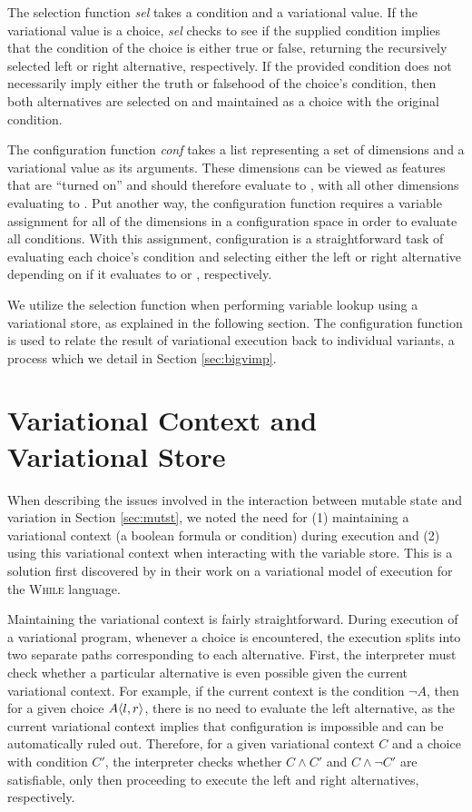 \documentclass[12pt,oneside]{book}
\begin{document}
The selection function \emph{sel} takes a condition and a variational value. If the variational value is a choice, \emph{sel} checks to see
if the supplied condition implies that the condition of the choice is either true or false, returning the recursively selected left or right alternative, respectively.
If the provided condition does not necessarily imply either the truth or falsehood of the choice's condition, then both alternatives are selected on
and maintained as a choice with the original condition.

The configuration function \emph{conf} takes a list representing a set of dimensions and a variational value as its arguments. These dimensions can be viewed as
features that are ``turned on'' and should therefore evaluate to , with all other dimensions evaluating to . Put another way, the configuration
function requires a variable assignment for all of the dimensions in a configuration space in order to evaluate all conditions. With this assignment, configuration
is a straightforward task of evaluating each choice's condition and selecting either the left or right alternative depending on if it evaluates to  or , respectively.

We utilize the selection function when performing variable lookup using a variational store, as explained in the following section. The configuration function is used to
relate the result of variational execution back to individual variants, a process which we detail in Section \ref{sec:bigvimp}.

\section{Variational Context and Variational Store}
\label{sec:vcvs}

When describing the issues involved in the interaction between mutable state and variation in Section \ref{sec:mutst}, we noted the need for (1) maintaining a variational context
(a boolean formula or condition)
during execution and (2) using this variational context when interacting with the variable store. This is a solution first discovered by \cite{varwhile} in their work on a
variational model of execution for the \textsc{While} language.

Maintaining the variational context is fairly straightforward. During execution of a variational program, whenever a choice is encountered, the execution splits into
two separate paths corresponding to each alternative. First, the interpreter must check whether a particular alternative is even possible given the current variational
context. For example, if the current context is the condition $\neg A$, then for a given choice $A \langle l, r \rangle$, there is no need to evaluate the left alternative, as the current
variational context implies that
configuration is impossible and can be automatically ruled out. Therefore, for a given variational context $C$ and a choice with condition $C'$, the interpreter checks
whether $C \wedge C'$ and $C \wedge \neg C'$ are satisfiable, only then proceeding to execute the left and right alternatives, respectively.
\end{document}
